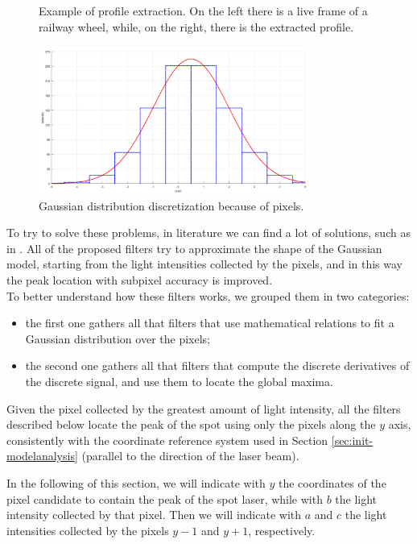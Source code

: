 \begin{figure}[t!]
\begin{minipage}{0.49\textwidth}
    \end{minipage}
    \caption{Example of profile extraction. On the left there is a live frame of a railway wheel, while, on the right, there is the extracted profile.}
    \label{fig:tech:laser-example}
  \end{figure}
\vfill
  \begin{figure}[t!]
    \centering
    \includegraphics[width=0.79\textwidth]{./images/tech/gauss-discr.png}
    \caption{Gaussian distribution discretization because of pixels.}
    \label{fig:gauss-discr}
  \end{figure}

To try to solve these problems, in literature we can find a lot of solutions, such as in \cite{BLAIS1986145}\cite{Dorsch:94}\cite{1334612}\cite{Naidu1991}\cite{doi:10.1080/095119298130642}.
All of the proposed filters try to approximate the shape of the Gaussian model, starting from the light intensities collected by the pixels, and in this way the peak location with subpixel accuracy is improved. \\
To better understand how these filters works, we grouped them in two categories:
  \begin{itemize}
    \item the first one gathers all that filters that use mathematical relations to fit a Gaussian distribution over the pixels;
    \item the second one gathers all that filters that compute the discrete derivatives of the discrete signal, and use them to locate the global maxima.
  \end{itemize}
Given the pixel collected by the greatest amount of light intensity, all the filters described below locate the peak of the spot using only the pixels along the $y$ axis, consistently with the coordinate reference system used in Section \ref{sec:init-modelanalysis} (parallel to the direction of the laser beam).

In the following of this section, we will indicate with $y$ the coordinates of the pixel candidate to contain the peak of the spot laser, while with $b$ the light intensity collected by that pixel. Then we will indicate with $a$ and $c$ the light intensities collected by the pixels $y-1$ and $y+1$, respectively.

